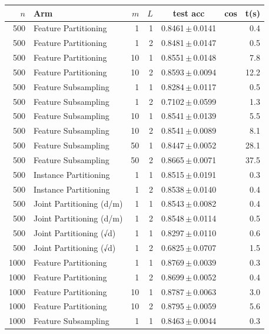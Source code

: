 \begin{table}[ht]
\centering\small
\begin{tabular}{rlrrccr}
\toprule
$n$ & Arm & $m$ & $L$ & test acc & cos & t(s) \\
\midrule
500 & Feature Partitioning & 1 & 1 & 0.8461\,$\pm$\,0.0141 &  & 0.4 \\
500 & Feature Partitioning & 1 & 2 & 0.8481\,$\pm$\,0.0147 &  & 0.5 \\
500 & Feature Partitioning & 10 & 1 & 0.8551\,$\pm$\,0.0148 &  & 7.8 \\
500 & Feature Partitioning & 10 & 2 & 0.8593\,$\pm$\,0.0094 &  & 12.2 \\
500 & Feature Subsampling & 1 & 1 & 0.8284\,$\pm$\,0.0117 &  & 0.5 \\
500 & Feature Subsampling & 1 & 2 & 0.7102\,$\pm$\,0.0599 &  & 1.3 \\
500 & Feature Subsampling & 10 & 1 & 0.8541\,$\pm$\,0.0139 &  & 5.5 \\
500 & Feature Subsampling & 10 & 2 & 0.8541\,$\pm$\,0.0089 &  & 8.1 \\
500 & Feature Subsampling & 50 & 1 & 0.8447\,$\pm$\,0.0052 &  & 28.1 \\
500 & Feature Subsampling & 50 & 2 & 0.8665\,$\pm$\,0.0071 &  & 37.5 \\
500 & Instance Partitioning & 1 & 1 & 0.8515\,$\pm$\,0.0191 &  & 0.3 \\
500 & Instance Partitioning & 1 & 2 & 0.8538\,$\pm$\,0.0140 &  & 0.4 \\
500 & Joint Partitioning (d/m) & 1 & 1 & 0.8543\,$\pm$\,0.0082 &  & 0.4 \\
500 & Joint Partitioning (d/m) & 1 & 2 & 0.8548\,$\pm$\,0.0114 &  & 0.5 \\
500 & Joint Partitioning (√d) & 1 & 1 & 0.8297\,$\pm$\,0.0110 &  & 0.6 \\
500 & Joint Partitioning (√d) & 1 & 2 & 0.6825\,$\pm$\,0.0707 &  & 1.5 \\
1000 & Feature Partitioning & 1 & 1 & 0.8769\,$\pm$\,0.0039 &  & 0.3 \\
1000 & Feature Partitioning & 1 & 2 & 0.8699\,$\pm$\,0.0052 &  & 0.4 \\
1000 & Feature Partitioning & 10 & 1 & 0.8787\,$\pm$\,0.0063 &  & 3.0 \\
1000 & Feature Partitioning & 10 & 2 & 0.8795\,$\pm$\,0.0059 &  & 5.6 \\
1000 & Feature Subsampling & 1 & 1 & 0.8463\,$\pm$\,0.0044 &  & 0.3 \\

\end{tabular}
\end{table}
